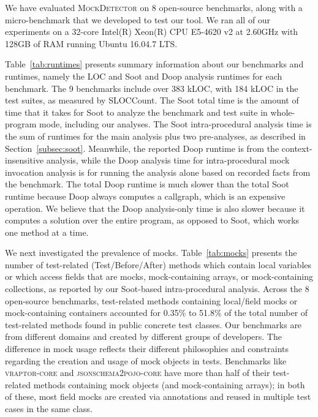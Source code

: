 
We have evaluated \textsc{MockDetector} on 8 open-source benchmarks, along with a micro-benchmark that we developed to test our tool. We ran all of our experiments on a 32-core Intel(R) Xeon(R) CPU E5-4620 v2 at 2.60GHz with 128GB of RAM running Ubuntu 16.04.7 LTS.

Table~\ref{tab:runtimes} presents summary information about our benchmarks and runtimes, namely the LOC and Soot and Doop analysis runtimes for each benchmark. The 9 benchmarks include over 383 kLOC, with 184 kLOC in the test suites, as measured by SLOCCount. The Soot total time is the amount of time that it takes for Soot to analyze the benchmark and test suite in whole-program mode, including our analyses. The Soot intra-procedural analysis time is the sum of runtimes for the main analysis plus two pre-analyses, as described in Section~\ref{subsec:soot}. Meanwhile, the reported Doop runtime is from the context-insensitive analysis, while the Doop analysis time for intra-procedural mock invocation analysis is for running the analysis alone based on recorded facts from the benchmark. The total Doop runtime is much slower than the total Soot runtime because Doop always computes a callgraph, which is an expensive operation. We believe that the Doop analysis-only time is also slower because it computes a solution over the entire program, as opposed to Soot, which works one method at a time.

We next investigated the prevalence of mocks. Table~\ref{tab:mocks} presents the number of test-related (Test/Before/After) methods which contain local variables or which access fields that are mocks, mock-containing arrays, or mock-containing collections, as reported by our Soot-based intra-procedural analysis. Across the 8 open-source benchmarks, test-related methods containing local/field mocks or mock-containing containers accounted for 0.35\% to 51.8\% of the total number of test-related methods found in public concrete test classes. Our benchmarks are from different domains and created by different groups of developers. The difference in mock usage reflects their different philosophies and constraints regarding the creation and usage of mock objects in tests. Benchmarks like \textsc{vraptor-core} and \textsc{jsonschema2pojo-core} have more than half of their test-related methods containing mock objects (and mock-containing arrays); in both of these, most field mocks are created via annotations and reused in multiple test cases in the same class.

